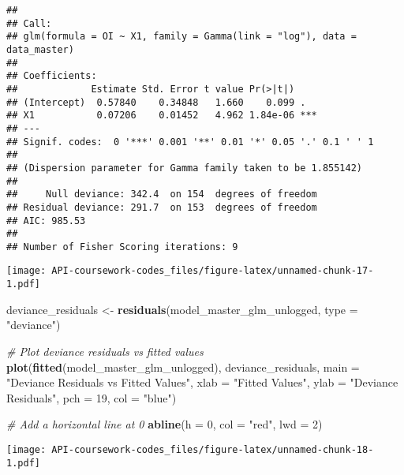 \documentclass[
]{article}
\newenvironment{Shaded}{\begin{snugshade}}{\end{snugshade}}
\newcommand{\AttributeTok}[1]{\textcolor[rgb]{0.13,0.29,0.53}{#1}}
\newcommand{\CommentTok}[1]{\textcolor[rgb]{0.56,0.35,0.01}{\textit{#1}}}
\newcommand{\DecValTok}[1]{\textcolor[rgb]{0.00,0.00,0.81}{#1}}
\newcommand{\FunctionTok}[1]{\textcolor[rgb]{0.13,0.29,0.53}{\textbf{#1}}}
\newcommand{\NormalTok}[1]{#1}
\newcommand{\OtherTok}[1]{\textcolor[rgb]{0.56,0.35,0.01}{#1}}
\newcommand{\SpecialCharTok}[1]{\textcolor[rgb]{0.81,0.36,0.00}{\textbf{#1}}}
\newcommand{\StringTok}[1]{\textcolor[rgb]{0.31,0.60,0.02}{#1}}
\begin{document}
\begin{verbatim}
## 
## Call:
## glm(formula = OI ~ X1, family = Gamma(link = "log"), data = data_master)
## 
## Coefficients:
##             Estimate Std. Error t value Pr(>|t|)    
## (Intercept)  0.57840    0.34848   1.660    0.099 .  
## X1           0.07206    0.01452   4.962 1.84e-06 ***
## ---
## Signif. codes:  0 '***' 0.001 '**' 0.01 '*' 0.05 '.' 0.1 ' ' 1
## 
## (Dispersion parameter for Gamma family taken to be 1.855142)
## 
##     Null deviance: 342.4  on 154  degrees of freedom
## Residual deviance: 291.7  on 153  degrees of freedom
## AIC: 985.53
## 
## Number of Fisher Scoring iterations: 9
\end{verbatim}

\begin{Shaded}
\end{Shaded}

\texttt{[image: API-coursework-codes\_files/figure-latex/unnamed-chunk-17-1.pdf]}

\begin{Shaded}
\begin{Highlighting}[]
\NormalTok{deviance\_residuals }\OtherTok{\textless{}{-}} \FunctionTok{residuals}\NormalTok{(model\_master\_glm\_unlogged, }\AttributeTok{type =} \StringTok{"deviance"}\NormalTok{)}

\CommentTok{\# Plot deviance residuals vs fitted values}
\FunctionTok{plot}\NormalTok{(}\FunctionTok{fitted}\NormalTok{(model\_master\_glm\_unlogged), deviance\_residuals,}
     \AttributeTok{main =} \StringTok{"Deviance Residuals vs Fitted Values"}\NormalTok{,}
     \AttributeTok{xlab =} \StringTok{"Fitted Values"}\NormalTok{, }\AttributeTok{ylab =} \StringTok{"Deviance Residuals"}\NormalTok{,}
     \AttributeTok{pch =} \DecValTok{19}\NormalTok{, }\AttributeTok{col =} \StringTok{"blue"}\NormalTok{)}

\CommentTok{\# Add a horizontal line at 0}
\FunctionTok{abline}\NormalTok{(}\AttributeTok{h =} \DecValTok{0}\NormalTok{, }\AttributeTok{col =} \StringTok{"red"}\NormalTok{, }\AttributeTok{lwd =} \DecValTok{2}\NormalTok{)}
\end{Highlighting}
\end{Shaded}

\texttt{[image: API-coursework-codes\_files/figure-latex/unnamed-chunk-18-1.pdf]}
\end{document}

